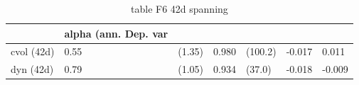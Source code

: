 \begin{table}[htbp]
  \centering
  \caption{table F6 42d spanning}
  \label{tab:table_F6_42d_spanning}
  \begin{tabular}{lllllll}
\toprule
 & alpha (ann. %
Dep. var &  &  &  &  &  &  \\
\midrule
cvol (42d) & 0.55 & (1.35) & 0.980 & (100.2) & -0.017 & 0.011 \\
dyn (42d) & 0.79 & (1.05) & 0.934 & (37.0) & -0.018 & -0.009 \\
\bottomrule
\end{tabular}

\end{table}

